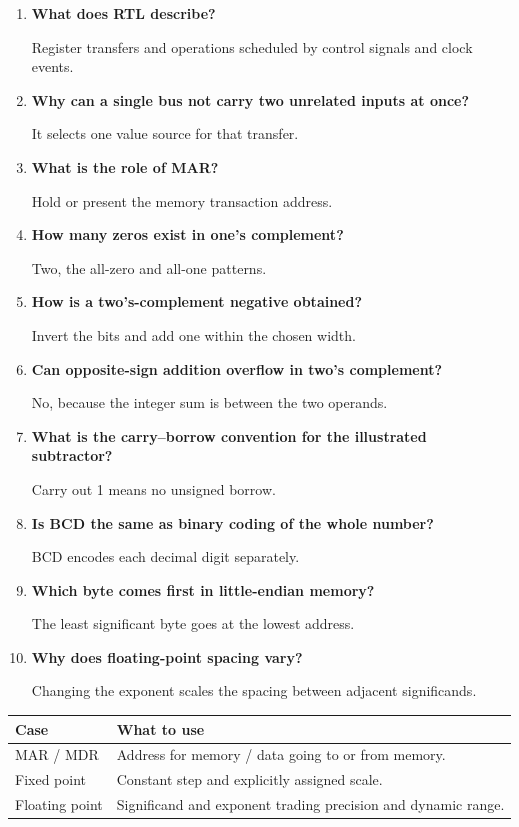 \documentclass[12pt,a4paper]{article}
\newcommand{\Q}[1]{\textbf{#1}\par\noindent\ignorespaces}
\begin{document}
\begin{tcolorbox}[exambox,title={Frequently Asked / Viva Questions}]
\begin{enumerate}[topsep=0pt, label=\textbf{Q\arabic*.}, itemsep=5pt]
\item \Q{What does RTL describe?}
Register transfers and operations scheduled by control signals and clock events.
\item \Q{Why can a single bus not carry two unrelated inputs at once?}
It selects one value source for that transfer.
\item \Q{What is the role of MAR?}
Hold or present the memory transaction address.
\item \Q{How many zeros exist in one's complement?}
Two, the all-zero and all-one patterns.
\item \Q{How is a two's-complement negative obtained?}
Invert the bits and add one within the chosen width.
\item \Q{Can opposite-sign addition overflow in two's complement?}
No, because the integer sum is between the two operands.
\item \Q{What is the carry--borrow convention for the illustrated subtractor?}
Carry out 1 means no unsigned borrow.
\item \Q{Is BCD the same as binary coding of the whole number?}
BCD encodes each decimal digit separately.
\item \Q{Which byte comes first in little-endian memory?}
The least significant byte goes at the lowest address.
\item \Q{Why does floating-point spacing vary?}
Changing the exponent scales the spacing between adjacent significands.
\end{enumerate}
\end{tcolorbox}
\begin{tcolorbox}[tikzbox,title={Summary comparison}]
\begin{tabularx}{\linewidth}{|B{4cm}|Y|}\hline
\textbf{Case} & \textbf{What to use} \\ \hline
MAR / MDR & Address for memory / data going to or from memory. \\ \hline
Fixed point & Constant step and explicitly assigned scale. \\ \hline
Floating point & Significand and exponent trading precision and dynamic range. \\ \hline
\end{tabularx}
\end{tcolorbox}
\end{document}
